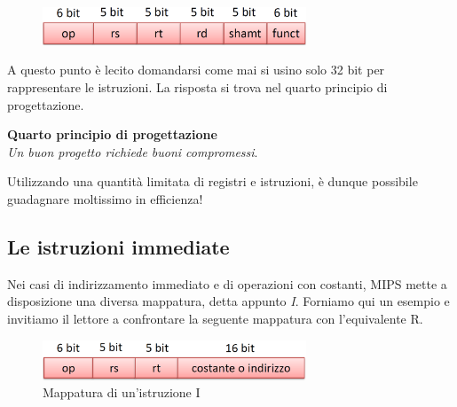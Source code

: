 \documentclass[class=book, crop=false, oneside]{standalone}
\begin{document}
\begin{figure}[H]
	\centering
	\includegraphics[width=0.7\textwidth,keepaspectratio]{mappatura.png}
\end{figure}

A questo punto è lecito domandarsi come mai si usino solo 32 bit per rappresentare le istruzioni. La risposta si trova nel quarto principio di progettazione.

\vspace{8pt}
\begin{tcolorbox}
\centering
\textbf{Quarto principio di progettazione}\\
\emph{Un buon progetto richiede buoni compromessi}.
\end{tcolorbox}
\vspace{5pt}

Utilizzando una quantità limitata di registri e istruzioni, è dunque possibile guadagnare moltissimo in efficienza!

\subsection{Le istruzioni immediate}
Nei casi di indirizzamento immediato e di operazioni con costanti, MIPS mette a disposizione una diversa mappatura, detta appunto \emph{I}. Forniamo qui un esempio e invitiamo il lettore a confrontare la seguente mappatura con l'equivalente R.
\begin{figure}[H]
	\centering
	\includegraphics[width=0.7\textwidth,keepaspectratio]{I.png}
	\caption{Mappatura di un'istruzione I}
\end{figure}
\end{document}
